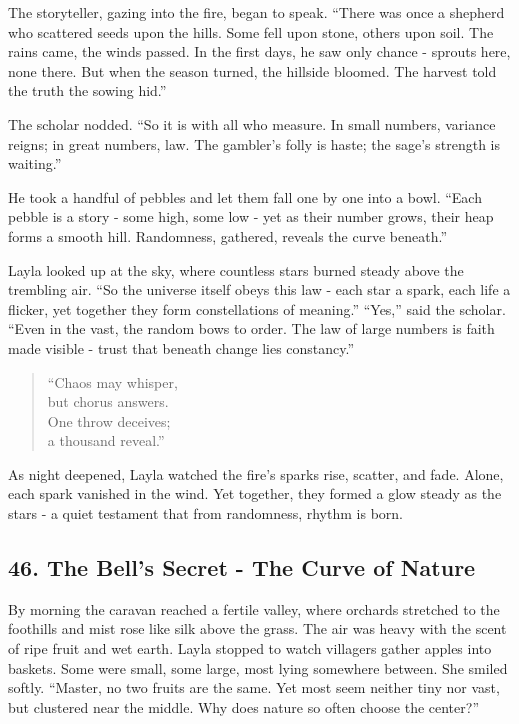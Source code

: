 \documentclass[
  letterpaper,
  DIV=11,
  numbers=noendperiod]{scrreprt}
\begin{document}
The storyteller, gazing into the fire, began to speak. ``There was once
a shepherd who scattered seeds upon the hills. Some fell upon stone,
others upon soil. The rains came, the winds passed. In the first days,
he saw only chance - sprouts here, none there. But when the season
turned, the hillside bloomed. The harvest told the truth the sowing
hid.''

The scholar nodded. ``So it is with all who measure. In small numbers,
variance reigns; in great numbers, law. The gambler's folly is haste;
the sage's strength is waiting.''

He took a handful of pebbles and let them fall one by one into a bowl.
``Each pebble is a story - some high, some low - yet as their number
grows, their heap forms a smooth hill. Randomness, gathered, reveals the
curve beneath.''

Layla looked up at the sky, where countless stars burned steady above
the trembling air. ``So the universe itself obeys this law - each star a
spark, each life a flicker, yet together they form constellations of
meaning.'' ``Yes,'' said the scholar. ``Even in the vast, the random
bows to order. The law of large numbers is faith made visible - trust
that beneath change lies constancy.''

\begin{quote}
``Chaos may whisper,\\
but chorus answers.\\
One throw deceives;\\
a thousand reveal.''
\end{quote}

As night deepened, Layla watched the fire's sparks rise, scatter, and
fade. Alone, each spark vanished in the wind. Yet together, they formed
a glow steady as the stars - a quiet testament that from randomness,
rhythm is born.

\subsection{46. The Bell's Secret - The Curve of
Nature}\label{the-bells-secret---the-curve-of-nature}

By morning the caravan reached a fertile valley, where orchards
stretched to the foothills and mist rose like silk above the grass. The
air was heavy with the scent of ripe fruit and wet earth. Layla stopped
to watch villagers gather apples into baskets. Some were small, some
large, most lying somewhere between. She smiled softly. ``Master, no two
fruits are the same. Yet most seem neither tiny nor vast, but clustered
near the middle. Why does nature so often choose the center?''
\end{document}
